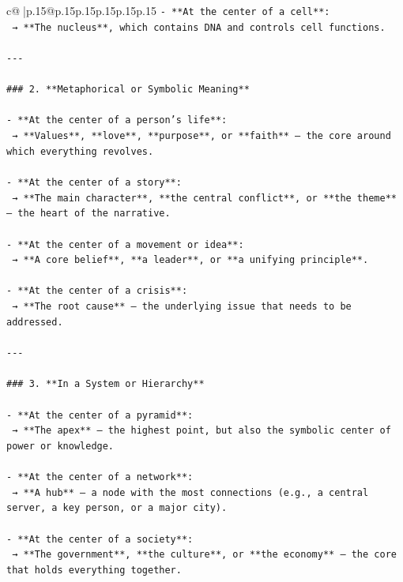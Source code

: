\documentclass{article}
\begin{document}
{\begin{supertabular}{c@{$\;$}|p{.15\linewidth}@{}p{.15\linewidth}p{.15\linewidth}p{.15\linewidth}p{.15\linewidth}p{.15\linewidth}}
{{{\texttt{{-} **At the center of a cell**:  } \\
\texttt{  → **The nucleus**, which contains DNA and controls cell functions.} \\
\\ 
\texttt{{-}{-}{-}} \\
\\ 
\texttt{\#\#\# 2. **Metaphorical or Symbolic Meaning**} \\
\\ 
\texttt{{-} **At the center of a person’s life**:  } \\
\texttt{  → **Values**, **love**, **purpose**, or **faith** — the core around which everything revolves.} \\
\\ 
\texttt{{-} **At the center of a story**:  } \\
\texttt{  → **The main character**, **the central conflict**, or **the theme** — the heart of the narrative.} \\
\\ 
\texttt{{-} **At the center of a movement or idea**:  } \\
\texttt{  → **A core belief**, **a leader**, or **a unifying principle**.} \\
\\ 
\texttt{{-} **At the center of a crisis**:  } \\
\texttt{  → **The root cause** — the underlying issue that needs to be addressed.} \\
\\ 
\texttt{{-}{-}{-}} \\
\\ 
\texttt{\#\#\# 3. **In a System or Hierarchy**} \\
\\ 
\texttt{{-} **At the center of a pyramid**:  } \\
\texttt{  → **The apex** — the highest point, but also the symbolic center of power or knowledge.} \\
\\ 
\texttt{{-} **At the center of a network**:  } \\
\texttt{  → **A hub** — a node with the most connections (e.g., a central server, a key person, or a major city).} \\
\\ 
\texttt{{-} **At the center of a society**:  } \\
\texttt{  → **The government**, **the culture**, or **the economy** — the core that holds everything together.} \\
}}}
\end{supertabular}}
\end{document}
